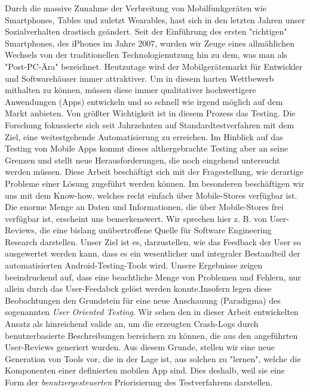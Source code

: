 \documentclass{seal_thesis}
\begin{document}
\begin{zusammenfassung}
Durch die massive Zunahme der Verbreitung von Mobilfunkgeräten wie Smartphones, Tables und zuletzt Wearables, hast sich in den letzten Jahren unser Sozialverhalten drastisch geändert. Seit der Einführung des ersten "richtigen" Smartphones, des iPhones im Jahre 2007, wurden wir Zeuge eines allmählichen Wechsels von der traditionellen Technologienutzung hin zu dem, was man als "Post-PC-Ära" bezeichnet. Heutzutage wird der Mobilgerätemarkt für Entwickler und Softwarehäuser immer attraktiver. Um in diesem harten Wettbewerb mithalten zu können, müssen diese immer qualitativer hochwertigere Anwendungen (Apps) entwickeln und so schnell wie irgend möglich auf dem Markt anbieten. Von größter Wichtigkeit ist in diesem Prozess das Testing. Die Forschung fokussierte sich seit Jahrzehnten auf Standardtestverfahren mit dem Ziel, eine weitestgehende Automatisierung zu erreichen. Im Hinblick auf das Testing von Mobile Apps kommt dieses althergebrachte Testing aber an seine Grenzen und stellt neue Herausforderungen, die noch eingehend untersucht werden müssen. Diese Arbeit beschäftigt sich mit der Fragestellung, wie derartige Probleme einer Lösung zugeführt werden können. Im besonderen beschäftigen wir uns mit dem Know-how, welches recht einfach über Mobile-Stores verfügbar ist. Die enorme Menge an Daten und Informationen, die über Mobile-Stores frei verfügbar ist, erscheint uns bemerkenswert. Wir sprechen hier z. B. von User-Reviews, die eine bislang unübertroffene Quelle für Software Engineering Research darstellen. Unser Ziel ist es, darzustellen, wie das Feedback der User so ausgewertet werden kann, dass es ein wesentlicher und integraler Bestandteil der automatisierten Android-Testing-Tools wird.
Unsere Ergebnisse zeigen beeindruckend auf, dass eine beachtliche Menge von Problemen und Fehlern, nur allein durch das User-Feedabck gelöst werden konnte.Insofern legen diese Beobachtungen den Grundstein für eine neue Anschauung (Paradigma) des sogenannten \textit{User Oriented Testing}.
Wir sehen den in dieser Arbeit entwickelten Ansatz als hinreichend valide an, um die erzeugten Crash-Logs durch benutzerbasierte Beschreibungen bereichern zu können, die aus den angeführten User-Reviews generiert wurden.
Aus diesem Grunde, stellen wir eine neue Generation von Tools vor, die in der Lage ist, aus solchen zu "lernen", welche die Komponenten einer definierten mobilen App sind.
Dies deshalb, weil sie eine Form der \textit{benutzergesteuerten} Priorisierung des Testverfahrens darstellen.
\end{zusammenfassung}
\end{document}
